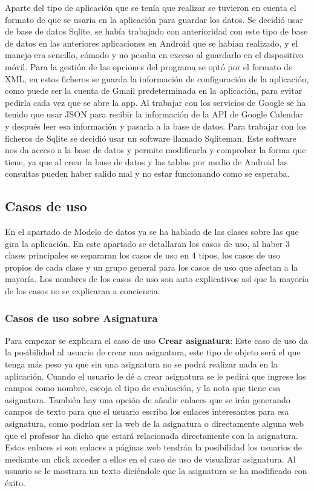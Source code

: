 Aparte del tipo de aplicación que se tenía que realizar se tuvieron en cuenta el formato de que se usaría en la aplicación para guardar los datos.
Se decidió usar de base de datos Sqlite, se había trabajado con anterioridad con este tipo de base de datos en las anteriores aplicaciones en Android que se habían realizado, y el manejo era sencillo, cómodo y no pesaba en exceso al guardarlo en el dispositivo móvil.
Para la gestión de las opciones del programa se optó por el formato de XML, en estos ficheros se guarda la información de configuración de la aplicación, como puede ser la cuenta de Gmail predeterminada en la aplicación, para evitar pedirla cada vez que se abre la app.
Al trabajar con los servicios de Google se ha tenido que usar JSON para recibir la información de la API de Google Calendar y después leer esa información y pasarla a la base de datos.
Para trabajar con los ficheros de Sqlite se decidió usar un software llamado Sqliteman.
Este software nos da acceso a la base de datos y permite modificarla y comprobar la forma que tiene, ya que al crear la base de datos y las tablas por medio de Android las consultas pueden haber salido mal y no estar funcionando como se esperaba.

\subsection{Casos de uso}
\label{subsecc:casos de uso}

En el apartado de Modelo de datos ya se ha hablado de las clases sobre las que gira la aplicación.
En este apartado se detallaran los casos de uso, al haber 3 clases principales se separaran los casos de uso en 4  tipos, los casos de uso propios de cada clase y un grupo general para los casos de uso que afectan a la mayoría.
Los nombres de los casos de uso son auto explicativos así que la mayoría de los casos no se explicaran a conciencia.

\subsubsection{Casos de uso sobre Asignatura}
\label{subsubsecc:Casos de uso sobre Asignatura}

Para empezar se explicara el caso de uso \textbf{Crear asignatura}:
Este caso de uso da la posibilidad al usuario de crear una asignatura, este tipo de objeto será el que tenga más peso ya que sin una asignatura no se podrá realizar nada en la aplicación.
Cuando el usuario le dé a crear asignatura se le pedirá que ingrese los campos como nombre, escoja el tipo de evaluación, y la nota que tiene esa asignatura.
También hay una opción de añadir enlaces que se irán generando campos de texto para que el usuario escriba los enlaces interesantes para esa asignatura, como podrían ser la web de la asignatura o directamente alguna web que el profesor ha dicho que estará relacionada directamente con la asignatura. Estos enlaces si son enlaces a páginas web tendrán la posibilidad los usuarios de mediante un click acceder a ellos en el caso de uso de visualizar asignatura.
Al usuario se le mostrara un texto diciéndole que la asignatura se ha modificado con éxito.


